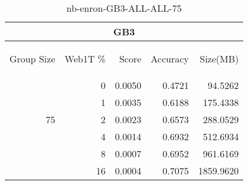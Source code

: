 \begin{center}
\begin{table}[htbp] 
 \begin{center}
\begin{tabular}{ | r | r | r | r | r |}
\hline
\multicolumn{5}{|c|}{GB3}\\
\hline
\begin{sideways}Group Size\end{sideways} & \begin{sideways}Web1T \%\end{sideways} & \begin{sideways}Score\end{sideways} & \begin{sideways}Accuracy\end{sideways} & \begin{sideways}Size(MB)\end{sideways}\\
\hline
\multirow{5}{*}{75}
 & 0 & 0.0050 & 0.4721 & 94.5262\\ \cline{2-5}
 & 1 & 0.0035 & 0.6188 & 175.4338\\ \cline{2-5}
 & 2 & 0.0023 & 0.6573 & 288.0529\\ \cline{2-5}
 & 4 & 0.0014 & 0.6932 & 512.6934\\ \cline{2-5}
 & 8 & 0.0007 & 0.6952 & 961.6169\\ \cline{2-5}
 & 16 & 0.0004 & 0.7075 & 1859.9620\\ \cline{2-5}
\hline
\end{tabular}
\caption{nb-enron-GB3-ALL-ALL-75}
\label{table:nb-enron-GB3-ALL-ALL-75}
\end{center}
 \end{table}
\end{center}

